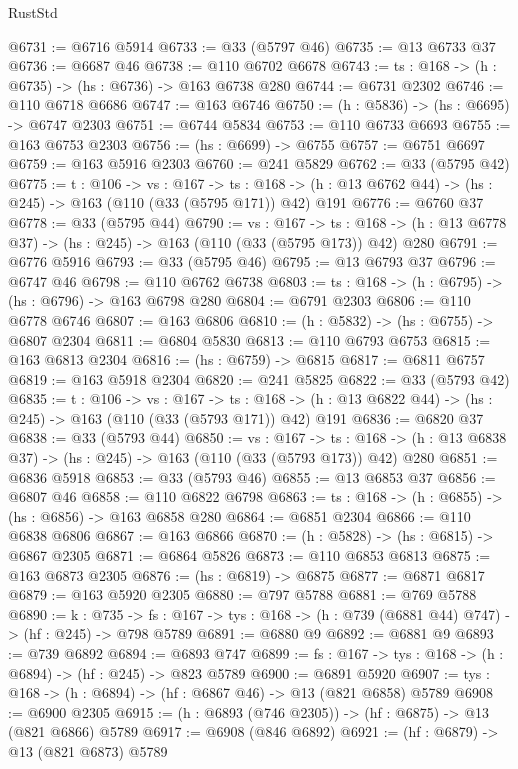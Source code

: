 \begin{lexlean}{RustStd}
\begin{coremodule}
@6731 := @6716 @5914
@6733 := @33 (@5797 @46)
@6735 := @13 @6733 @37
@6736 := @6687 @46
@6738 := @110 @6702 @6678
@6743 := {ts : @168} -> (h : @6735) -> (hs : @6736) -> @163 @6738 @280
@6744 := @6731 @2302
@6746 := @110 @6718 @6686
@6747 := @163 @6746
@6750 := (h : @5836) -> (hs : @6695) -> @6747 @2303
@6751 := @6744 @5834
@6753 := @110 @6733 @6693
@6755 := @163 @6753 @2303
@6756 := (hs : @6699) -> @6755
@6757 := @6751 @6697
@6759 := @163 @5916 @2303
@6760 := @241 @5829
@6762 := @33 (@5795 @42)
@6775 := {t : @106} ->
  {vs : @167} ->
  {ts : @168} -> (h : @13 @6762 @44) -> (hs : @245) -> @163 (@110 (@33 (@5795 @171)) @42) @191
@6776 := @6760 @37
@6778 := @33 (@5795 @44)
@6790 := {vs : @167} ->
  {ts : @168} -> (h : @13 @6778 @37) -> (hs : @245) -> @163 (@110 (@33 (@5795 @173)) @42) @280
@6791 := @6776 @5916
@6793 := @33 (@5795 @46)
@6795 := @13 @6793 @37
@6796 := @6747 @46
@6798 := @110 @6762 @6738
@6803 := {ts : @168} -> (h : @6795) -> (hs : @6796) -> @163 @6798 @280
@6804 := @6791 @2303
@6806 := @110 @6778 @6746
@6807 := @163 @6806
@6810 := (h : @5832) -> (hs : @6755) -> @6807 @2304
@6811 := @6804 @5830
@6813 := @110 @6793 @6753
@6815 := @163 @6813 @2304
@6816 := (hs : @6759) -> @6815
@6817 := @6811 @6757
@6819 := @163 @5918 @2304
@6820 := @241 @5825
@6822 := @33 (@5793 @42)
@6835 := {t : @106} ->
  {vs : @167} ->
  {ts : @168} -> (h : @13 @6822 @44) -> (hs : @245) -> @163 (@110 (@33 (@5793 @171)) @42) @191
@6836 := @6820 @37
@6838 := @33 (@5793 @44)
@6850 := {vs : @167} ->
  {ts : @168} -> (h : @13 @6838 @37) -> (hs : @245) -> @163 (@110 (@33 (@5793 @173)) @42) @280
@6851 := @6836 @5918
@6853 := @33 (@5793 @46)
@6855 := @13 @6853 @37
@6856 := @6807 @46
@6858 := @110 @6822 @6798
@6863 := {ts : @168} -> (h : @6855) -> (hs : @6856) -> @163 @6858 @280
@6864 := @6851 @2304
@6866 := @110 @6838 @6806
@6867 := @163 @6866
@6870 := (h : @5828) -> (hs : @6815) -> @6867 @2305
@6871 := @6864 @5826
@6873 := @110 @6853 @6813
@6875 := @163 @6873 @2305
@6876 := (hs : @6819) -> @6875
@6877 := @6871 @6817
@6879 := @163 @5920 @2305
@6880 := @797 @5788
@6881 := @769 @5788
@6890 := {k : @735} ->
  {fs : @167} -> {tys : @168} -> (h : @739 (@6881 @44) @747) -> (hf : @245) -> @798 @5789
@6891 := @6880 @9
@6892 := @6881 @9
@6893 := @739 @6892
@6894 := @6893 @747
@6899 := {fs : @167} -> {tys : @168} -> (h : @6894) -> (hf : @245) -> @823 @5789
@6900 := @6891 @5920
@6907 := {tys : @168} -> (h : @6894) -> (hf : @6867 @46) -> @13 (@821 @6858) @5789
@6908 := @6900 @2305
@6915 := (h : @6893 (@746 @2305)) -> (hf : @6875) -> @13 (@821 @6866) @5789
@6917 := @6908 (@846 @6892)
@6921 := (hf : @6879) -> @13 (@821 @6873) @5789

\end{coremodule}
\end{lexlean}
